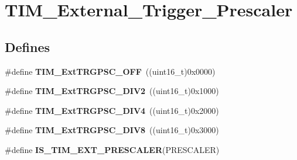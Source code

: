 \hypertarget{group__TIM__External__Trigger__Prescaler}{
\section{TIM\_\-External\_\-Trigger\_\-Prescaler}
\label{group__TIM__External__Trigger__Prescaler}
}
\subsection*{Defines}
\begin{DoxyCompactItemize}
\item 
\hypertarget{group__TIM__External__Trigger__Prescaler_ga1b21757d5d1b708edca7e20481797e96}{
\#define {\bfseries TIM\_\-ExtTRGPSC\_\-OFF}~((uint16\_\-t)0x0000)}
\label{group__TIM__External__Trigger__Prescaler_ga1b21757d5d1b708edca7e20481797e96}

\item 
\hypertarget{group__TIM__External__Trigger__Prescaler_ga446ed7f1bc28bcb295c43886da582e47}{
\#define {\bfseries TIM\_\-ExtTRGPSC\_\-DIV2}~((uint16\_\-t)0x1000)}
\label{group__TIM__External__Trigger__Prescaler_ga446ed7f1bc28bcb295c43886da582e47}

\item 
\hypertarget{group__TIM__External__Trigger__Prescaler_ga1de0031af7654fac2f29705f1da146c6}{
\#define {\bfseries TIM\_\-ExtTRGPSC\_\-DIV4}~((uint16\_\-t)0x2000)}
\label{group__TIM__External__Trigger__Prescaler_ga1de0031af7654fac2f29705f1da146c6}

\item 
\hypertarget{group__TIM__External__Trigger__Prescaler_gac2fe5014d69a93ce0a22b9f3f5a7d19a}{
\#define {\bfseries TIM\_\-ExtTRGPSC\_\-DIV8}~((uint16\_\-t)0x3000)}
\label{group__TIM__External__Trigger__Prescaler_gac2fe5014d69a93ce0a22b9f3f5a7d19a}

\item 
\#define {\bfseries IS\_\-TIM\_\-EXT\_\-PRESCALER}(PRESCALER)
\end{DoxyCompactItemize}


